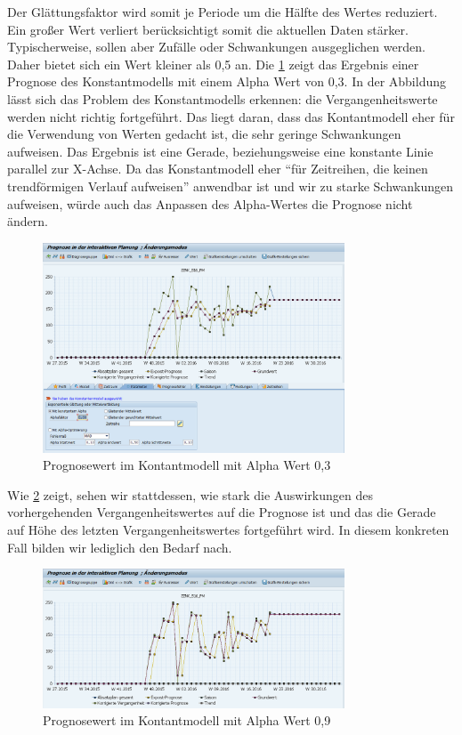 Der Glättungsfaktor wird somit je Periode um die Hälfte des Wertes reduziert. Ein großer Wert verliert berücksichtigt somit die aktuellen Daten stärker. Typischerweise, sollen aber Zufälle oder Schwankungen ausgeglichen werden. Daher bietet sich ein Wert  kleiner als 0,5 an.
Die \ref{fig:konst_03} zeigt das Ergebnis einer Prognose des Konstantmodells mit einem Alpha Wert von 0,3. In der Abbildung lässt sich das Problem des Konstantmodells erkennen: die Vergangenheitswerte werden nicht richtig fortgeführt. Das liegt daran, dass das Kontantmodell eher für die Verwendung von Werten gedacht ist, die sehr geringe Schwankungen aufweisen. Das Ergebnis ist eine Gerade, beziehungsweise eine konstante Linie parallel zur X-Achse. Da das Konstantmodell eher "`für Zeitreihen, die keinen trendförmigen Verlauf aufweisen"' \cite{scm:constmodel_3} anwendbar ist und wir zu starke Schwankungen aufweisen, würde auch das Anpassen des Alpha-Wertes die Prognose nicht ändern.

\begin{figure}[h]
	\centering
	\includegraphics[width=0.8\textwidth]{../pics/Konstantmodell_nko}
	\caption{Prognosewert im Kontantmodell mit Alpha Wert 0,3}
	\label{fig:konst_03}
\end{figure}


Wie \ref{fig:konst_09} zeigt, sehen wir stattdessen, wie stark die Auswirkungen des vorhergehenden Vergangenheitswertes auf die Prognose ist und das die Gerade auf Höhe des letzten Vergangenheitswertes fortgeführt wird. In diesem konkreten Fall bilden wir lediglich den Bedarf nach.

\begin{figure}[h]
	\centering
	\includegraphics[width=0.8\textwidth]{../pics/Konstantmodell_nko_a_0_9}
	\caption{Prognosewert im Kontantmodell mit Alpha Wert 0,9}
	\label{fig:konst_09}
\end{figure}


